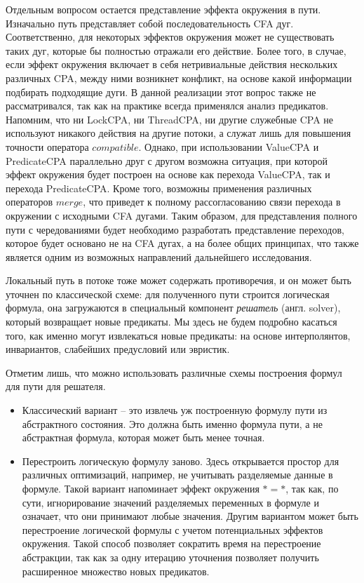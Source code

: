 Отдельным вопросом остается представление эффекта окружения в пути. 
Изначально путь представляет собой последовательность CFA дуг.
Соответственно, для некоторых эффектов окружения может не существовать таких дуг, которые бы полностью отражали его действие.
Более того, в случае, если эффект окружения включает в себя нетривиальные действия нескольких различных CPA, между ними возникнет конфликт, на основе какой информации подбирать подходящие дуги.
В данной реализации этот вопрос также не рассматривался, так как на практике всегда применялся анализ предикатов.
Напомним, что ни LockCPA, ни ThreadCPA, ни другие служебные CPA не используют никакого действия на другие потоки, а служат лишь для повышения точности оператора $compatible$.
Однако, при использовании ValueCPA и PredicateCPA параллельно друг с другом возможна ситуация, при которой эффект окружения будет построен на основе как перехода ValueCPA, так и перехода PredicateCPA.
Кроме того, возможны применения различных операторов $merge$, что приведет к полному рассогласованию связи перехода в окружении с исходными CFA дугами.
Таким образом, для представления полного пути с чередованиями будет необходимо разработать представление переходов, которое будет основано не на CFA дугах, а на более общих принципах, что также является одним из возможных направлений дальнейшего исследования.

Локальный путь в потоке тоже может содержать противоречия, и он может быть уточнен по классической схеме: для полученного пути строится логическая формула, она загружаются в специальный компонент \textit{решатель} (англ. solver), который возвращает новые предикаты.
Мы здесь не будем подробно касаться того, как именно могут извлекаться новые предикаты: на основе интерполянтов, инвариантов, слабейших предусловий или эвристик. 

Отметим лишь, что можно использовать различные схемы построения формул для пути для решателя.
\begin{itemize}
\item Классический вариант -- это извлечь уж построенную формулу пути из абстрактного состояния. 
Это должна быть именно формула пути, а не абстрактная формула, которая может быть менее точная.
\item Перестроить логическую формулу заново. Здесь открывается простор для различных оптимизаций, например, не учитывать разделяемые данные в формуле.
Такой вариант напоминает эффект окружения $* = *$, так как, по сути, игнорирование значений разделяемых переменных в формуле и означает, что они принимают любые значения.
Другим вариантом может быть перестроение логической формулы с учетом потенциальных эффектов окружения. 
Такой способ позволяет сократить время на перестроение абстракции, так как за одну итерацию уточнения позволяет получить расширенное множество новых предикатов.
\end{itemize}

